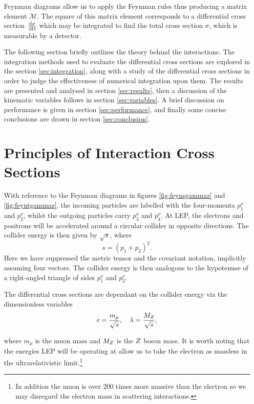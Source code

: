 \documentclass[]{article}
\begin{document}
Feynman diagrams allow us to apply the Feynman rules thus producing a  matrix element $\mathcal{M}$. The square of this matrix element corresponds to a differential cross section $\frac{\,\operatorname{d}\!{\sigma}}{\,\operatorname{d}\!{\Omega}}$ which may be integrated to find the total cross section $\sigma$, which is measurable by a detector.

The following section briefly outlines the theory behind the interactions. The integration methods used to evaluate the differential cross sections are explored in the section \ref{sec:integration}, along with a study of the differential cross sections in order to judge the effectiveness of numerical integration upon them. The results are presented and analysed in section \ref{sec:results}, then a discussion of the kinematic variables follows in section \ref{sec:variables}. A brief discussion on performance is given in section \ref{sec:performance}, and finally some concise conclusions are drawn in section \ref{sec:conclusion}.

\section{Principles of Interaction Cross Sections}

With reference to the Feynman diagrams in figures \ref{fig:feynsgammaz} and \ref{fig:feyntgammaz}, the incoming particles are labelled with the four-momenta $p_{1}^{\nu}$ and $p_{2}^{\nu}$, whilst the outgoing particles carry $p_{3}^{\nu}$ and $p_{4}^{\nu}$. At LEP, the electrons and positrons will be accelerated around a circular collider in opposite directions. The collider energy is then given by $\sqrt{s}$, where $$s = (p_{1} + p_{2})^{2}.$$ Here we have suppressed the metric tensor and the covariant notation, implicitly assuming four vectors. The collider energy is then analogous to the hypotenuse of a right-angled triangle of sides $p_{1}^{\nu}$ and $p_{2}^{\nu}$.

The differential cross sections are dependant on the collider energy via the dimensionless variables $$\varepsilon = \frac{m_{\mu}}{\sqrt{s}}, \quad \lambda = \frac{M_{Z }}{\sqrt{s}},$$

where $m_{\mu}$ is the muon mass and $M_{Z }$ is the $Z $ boson mass. It is worth noting that the energies LEP will be operating at allow us to take the electron as massless in the ultrarelativistic limit.\footnote{In addition the muon is over 200 times more massive than the electron so we may disregard the electron mass in scattering interactions.}
\end{document}
